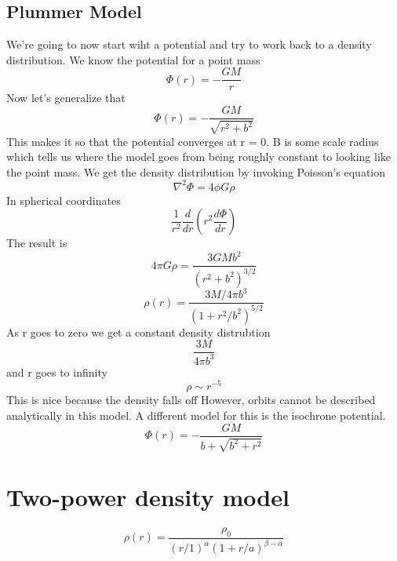 \documentclass[12pt]{article} %
\begin{document}
\subsection{Plummer Model}
We're going to now start wiht a potential and try to work back to a density distribution. We know the potential for a point mass 
\begin{equation}
\Phi(r) = -\frac{GM}{r}
\end{equation}
Now let's generalize that
\begin{equation}
\Phi(r) = -\frac{GM}{\sqrt{r^2 + b^2}}
\end{equation}
This makes it so that the potential converges at r = 0. B is some scale radius which tells us where the model goes from being roughly constant to looking like the point mass. We get the density distribution by invoking Poisson's equation
\begin{equation}
\nabla^2\Phi = 4\phi G\rho
\end{equation}
In spherical coordinates
\begin{equation}
\frac{1}{r^2} \frac{d}{dr} ( r^2 \frac{d\Phi}{dr})
\end{equation}
The result is 
\begin{equation}
4\pi G\rho = \frac{3GMb^2}{(r^2 + b^2)^{3/2}}
\end{equation}
\begin{equation}
\rho(r) = \frac{3M/4\pi b^3}{(1+r^2/b^2)^{5/2}}
\end{equation}
As r goes to zero we get a constant density distrubtion
\begin{equation}
\frac{3M}{4\pi b^3}
\end{equation}
and r goes to infinity
\begin{equation}
\rho \sim r^{-5}
\end{equation}
This is nice because the density falls off 
However, orbits cannot be described analytically in this model. A different model for this is the isochrone potential. 
\begin{equation}
\Phi(r) = -\frac{GM}{b + \sqrt{b^2+r^2}}
\end{equation}


\section{Two-power density model}
\begin{equation}
\rho(r) = \frac{\rho_0}{(r/1)^{\alpha} ( 1 + r/a)^{\beta-\alpha}}
\end{equation}
\end{document}
